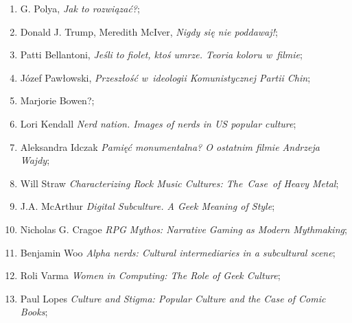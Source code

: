 \documentclass[a4paper,11pt]{article}
\begin{document}
\begin{enumerate}
\item G. Polya, \textit{Jak to rozwiązać?};



\item Donald J. Trump, Meredith McIver, \textit{Nigdy się nie poddawaj!};



\item Patti Bellantoni, \textit{Jeśli to fiolet, ktoś umrze. Teoria koloru
    w~filmie};



\item Józef Pawłowski, \textit{Przeszłość w~ideologii Komunistycznej Partii
    Chin};



\item Marjorie Bowen?;



\item Lori Kendall \textit{Nerd nation. Images of nerds in US popular
    culture};



\item Aleksandra Idczak \textit{Pamięć monumentalna? O ostatnim filmie
    Andrzeja Wajdy};



\item Will Straw \textit{Characterizing Rock Music Cultures: The~Case~of
  Heavy Metal};



\item J.A. McArthur \textit{Digital Subculture. A Geek Meaning of Style};



\item Nicholas G. Cragoe \textit{RPG Mythos: Narrative Gaming as
    Modern Mythmaking};



\item Benjamin Woo \textit{Alpha nerds: Cultural intermediaries in a
    subcultural scene};



\item Roli Varma \textit{Women in Computing: The Role of Geek Culture};



\item Paul Lopes \textit{Culture and Stigma: Popular Culture and the Case
    of Comic Books};




\end{enumerate}
\end{document}
